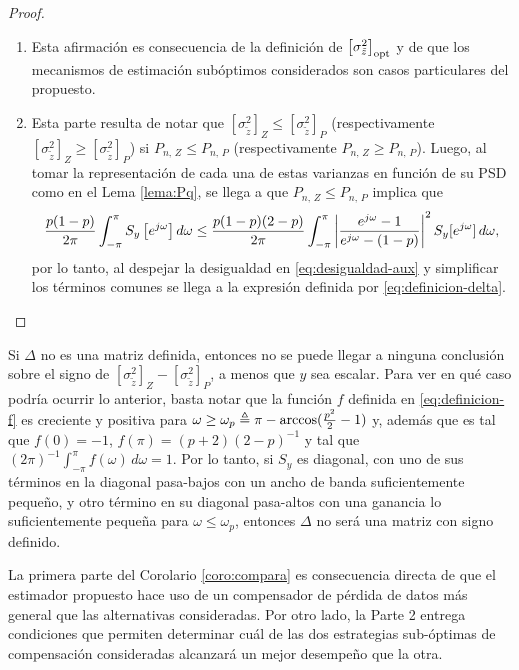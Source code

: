 \begin{proof}{\ \\}
\begin{enumerate}
\item Esta afirmación es consecuencia de la definici\'on de $\left[\sigma_{\tilde{z}}^2\right]_{\operatorname{opt}}$ y de que los mecanismos de estimaci\'on sub\'optimos considerados son casos particulares del propuesto.
\item Esta parte resulta de notar que $\left[ \sigma_{\tilde{z}}^2 \right]_{Z} \leq \left[\sigma_{\tilde{z}}^2 \right]_{P}$ (respectivamente $\left[ \sigma_{\tilde{z}}^2 \right]_{Z} \geq \left[\sigma_{\tilde{z}}^2 \right]_{P}$) si $P_{n, \,Z}\leq P_{n, \, P}$ (respectivamente $P_{n, \,Z}\geq P_{n, \, P}$). Luego, al tomar la representaci\'on de cada una de estas varianzas en funci\'on de su PSD como en el Lema \ref{lema:Pq}, se llega a que $P_{n, \,Z}\leq P_{n, \, P}$ implica que
\begin{equation}\label{eq:desigualdad-aux}
\frac{p(1-p)}{2\pi}\int_{-\pi}^{\pi}{S_y\left[e^{j\omega}\right]d\omega}\leq \frac{p(1-p)(2-p) }{2\pi}\int_{-\pi}^{\pi} \left\vert  \frac{e^{j\omega}-1}{e^{j\omega}-(1-p)}  \right\vert^2 S_y[e^{j\omega}] \,  d\omega,
\end{equation}
por lo tanto, al despejar la desigualdad en \eqref{eq:desigualdad-aux} y simplificar los t\'erminos comunes se llega a la expresi\'on definida por \eqref{eq:definicion-delta}.
\end{enumerate}
\QED
\end{proof}

\begin{obs}
Si $\Delta$ no es una matriz definida, entonces no se puede llegar a ninguna conclusi\'on sobre el signo de $\left[ \sigma_{\tilde{z}}^2 \right]_{Z} -\left[ \sigma_{\tilde{z}}^2 \right]_{P}$, a menos que $y$ sea escalar. Para ver en qu\'e caso podr\'ia ocurrir lo anterior, basta notar que la funci\'on $f$ definida en \eqref{eq:definicion-f} es creciente y positiva para $\omega \geq \omega_p \triangleq \pi-\arccos( \frac{p^2}{2}-1 )$ y, adem\'as que es tal que $f(0)=-1$, $f(\pi)=(p+2)(2-p)^{-1}$ y tal que $(2\pi)^{-1} \int_{-\pi}^{\pi} f(\omega) \, d\omega = 1$. Por lo tanto, si $S_y$ es diagonal, con uno de sus t\'erminos en la diagonal pasa-bajos con un ancho de banda suficientemente peque\~no, y otro t\'ermino en su diagonal pasa-altos con una ganancia lo suficientemente peque\~na para $\omega \leq \omega_p$, entonces $\Delta$ no ser\'a una matriz con signo definido.
\end{obs}

La primera parte del Corolario \ref{coro:compara} es consecuencia directa de que el estimador propuesto hace uso de un compensador de p\'erdida de datos m\'as general que las alternativas consideradas. Por otro lado, la Parte 2 entrega condiciones que permiten determinar cu\'al de las dos estrategias sub-\'optimas de compensaci\'on consideradas alcanzar\'a un mejor desempe\~no que la otra.

